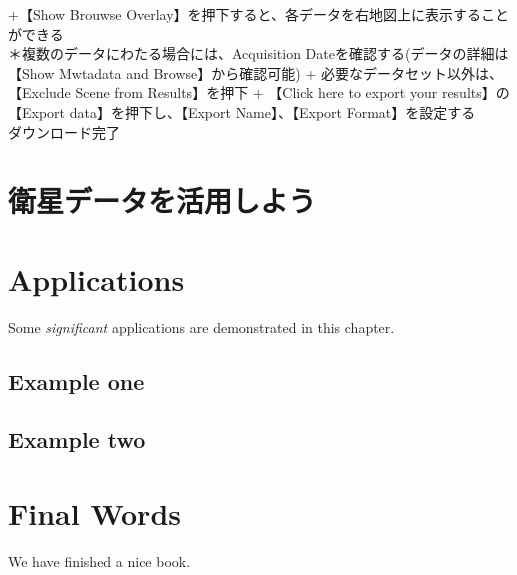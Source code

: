 \documentclass[
]{book}
\begin{document}
+【Show Brouwse Overlay】を押下すると、各データを右地図上に表示することができる\\
＊複数のデータにわたる場合には、Acquisition Dateを確認する(データの詳細は【Show Mwtadata and Browse】から確認可能)
+ 必要なデータセット以外は、【Exclude Scene from Results】を押下
+ 【Click here to export your results】の【Export data】を押下し、【Export Name】、【Export Format】を設定する\\
ダウンロード完了

\hypertarget{ux885bux661fux30c7ux30fcux30bfux3092ux6d3bux7528ux3057ux3088ux3046}{%
\chapter{衛星データを活用しよう}\label{ux885bux661fux30c7ux30fcux30bfux3092ux6d3bux7528ux3057ux3088ux3046}}

\hypertarget{applications}{%
\chapter{Applications}\label{applications}}

Some \emph{significant} applications are demonstrated in this chapter.

\hypertarget{example-one}{%
\section{Example one}\label{example-one}}

\hypertarget{example-two}{%
\section{Example two}\label{example-two}}

\hypertarget{final-words}{%
\chapter{Final Words}\label{final-words}}

We have finished a nice book.

  
\end{document}
